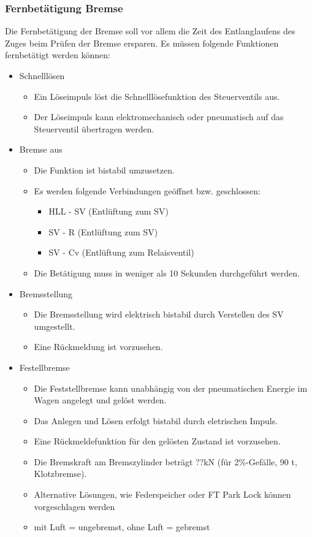 \subsubsection{Fernbetätigung Bremse}
Die Fernbetätigung der Bremse soll vor allem die Zeit des Entlanglaufens des Zuges beim Prüfen der Bremse ersparen. Es müssen folgende Funktionen fernbetätigt werden können:
\begin{itemize}
    \item Schnelllösen
    \begin{itemize}
        \item Ein Löseimpuls löst die Schnelllösefunktion des Steuerventils aus.
        \item Der Löseimpuls kann elektromechanisch oder pneumatisch auf das Steuerventil übertragen werden.
    \end{itemize}
    \item Bremse aus
    \begin{itemize}
        \item Die Funktion ist bistabil umzusetzen.
        \item 	Es werden folgende Verbindungen geöffnet bzw. geschlossen:
        \begin{itemize}
            \item HLL - SV (Entlüftung zum SV)
            \item SV - R (Entlüftung zum SV)
            \item SV - Cv (Entlüftung zum Relaisventil)
        \end{itemize}
        \item Die Betätigung muss in weniger als 10 Sekunden durchgeführt werden.
    \end{itemize}
    \item Bremsstellung
    \begin{itemize}
        \item Die Bremsstellung wird elektrisch bistabil durch Verstellen des SV umgestellt.
        \item Eine Rückmeldung ist vorzusehen.
    \end{itemize}
    \item Festellbremse
    \begin{itemize}
        \item Die Feststellbremse kann unabhängig von der pneumatischen Energie im Wagen angelegt und gelöst werden.
        \item Das Anlegen und Lösen erfolgt bistabil durch eletrischen Impuls.
        \item Eine Rückmeldefunktion für den gelösten Zustand ist vorzusehen.
        \item Die Bremskraft am Bremszylinder beträgt ??kN (für 2\%-Gefälle, 90 t, Klotzbremse).
        \item Alternative Lösungen, wie Federspeicher oder FT Park Lock können vorgeschlagen werden
        \item mit Luft = ungebremst, ohne Luft = gebremst
    \end{itemize}
\end{itemize}
